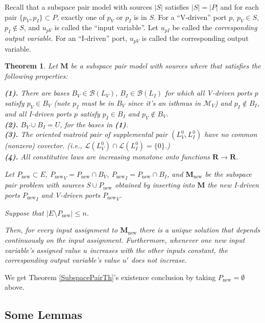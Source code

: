 \documentclass{amsproc-sunycstr}
\def\Reals{\ensuremath{\mathbf R}}
\theoremstyle{plain}
\newtheorem{theorem}{Theorem}
\theoremstyle{definition}
\theoremstyle{remark}
\newcommand{\Pnew}{{P_{\mbox{new}}}}
\newcommand{\Mnew}{{\mathbf{M}_{\mbox{new}}}}
\begin{document}
Recall that a subspace pair model with sources $|S|$ satisfies
$|S|=|P|$ and for each pair $\{p_V, p_I\}\subset P$, exactly one of
$p_V$ or $p_I$ is in $S$.  For a ``V-driven''  port $p$, 
$p_V\in S$, $p_I\not\in S$, and $u_{\mathit{pV}}$ is called the ``input
variable''.  Let $u_{\mathit{pI}}$ be called the 
\textit{corresponding output variable}.  For an ``I-driven'' port,
$u_{\mathit{pV}}$ is called the 
corresponding output variable.



\begin{theorem}
\label{SubspacePairThInd}
Let $\mathbf{M}$ be a subspace pair model with sources where 
that satisfies the following properties:

\textbf{(1).} There are bases $B_V\in\mathcal{B}(L_V)$,
$B_I\in\mathcal{B}(L_I)$ for which all V-driven 
ports $p$ satisfy $p_V\in B_V$ (note $p_I$ must be 
in $B_V$ since it's an isthmus in $\mathcal{M}_V$) 
and $p_I\not\in B_I$,
and all I-driven ports $p$ satisfy $p_I\in B_I$ and 
$p_V \not\in B_V$.  \\
\textbf{(2).}
$B_V\cup B_I = U$, for the bases in \textbf{(1)}.\\
\textbf{(3).} The oriented matroid pair of supplemental pair $(L_V^0,L_I^0)$ 
have no common (nonzero) covector.
(i.e., $\mathcal{L}(L_V^0)\cap\mathcal{L}(L_I^0)=\{0\}$.)\\
\textbf{(4).} 
All constitutive laws are increasing monotone onto functions 
$\Reals\rightarrow\Reals$.


Let $\Pnew\subset E$, $\Pnew_V=\Pnew\cap B_V$, 
$\Pnew_I=\Pnew\cap B_I$, and $\Mnew$ be the subspace pair problem with
sources $S\cup\Pnew$ obtained by inserting into $\mathbf{M}$ the 
new I-driven ports $\Pnew_I$ and V-driven ports $\Pnew_V$.

Suppose that $|E\setminus\Pnew|\leq n$.

Then, for every input assignment to $\Mnew$
there is a unique solution that depends 
continuously on the input assignment.  Furthermore, whenever one 
\textit{new} input variable's 
assigned value $u$ increases with the other
inputs constant,
the corresponding output variable's value $u'$ does not increase.

\end{theorem}

We get Theorem \ref{SubspacePairTh}'s existence conclusion by taking
$\Pnew=\emptyset$ above.


\subsection{Some Lemmas}
\end{document}
